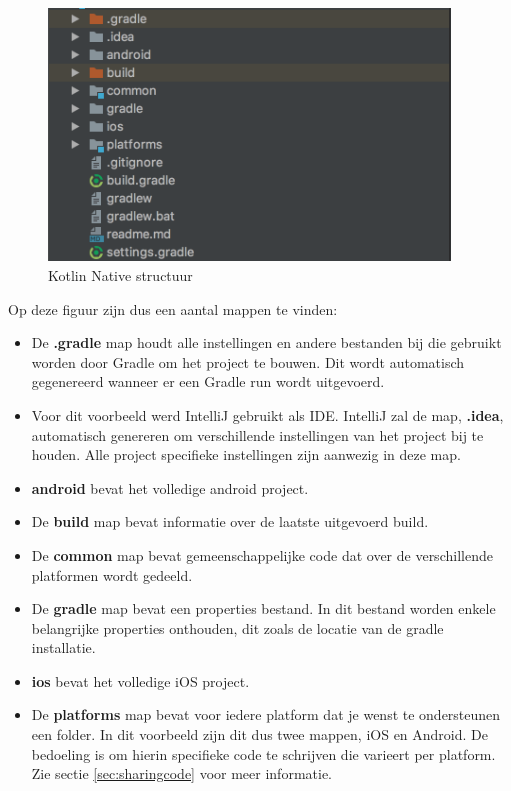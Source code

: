 \begin{figure} [ht]
	\centering
	\includegraphics[width=0.95\textwidth]{img/kn-project-structure}
	\caption{Kotlin Native structuur}
	\label{fig:knstructuur}
\end{figure}

Op deze figuur zijn dus een aantal mappen te vinden:
\begin{itemize}
	\item De \textbf{.gradle} map houdt alle instellingen en andere bestanden bij die gebruikt worden door Gradle om het project te bouwen. Dit wordt automatisch gegenereerd wanneer er een Gradle run wordt uitgevoerd.
	\item Voor dit voorbeeld werd IntelliJ gebruikt als IDE. IntelliJ zal de map, \textbf{.idea}, automatisch genereren om verschillende instellingen van het project bij te houden. Alle project specifieke instellingen zijn aanwezig in deze map.
	\item \textbf{android} bevat het volledige android project.
	\item De \textbf{build} map bevat informatie over de laatste uitgevoerd build.
	\item De \textbf{common} map bevat gemeenschappelijke code dat over de verschillende platformen wordt gedeeld.
	\item De \textbf{gradle} map bevat een properties bestand. In dit bestand worden enkele belangrijke properties onthouden, dit zoals de locatie van de gradle installatie.
	\item \textbf{ios} bevat het volledige iOS project.
	\item De \textbf{platforms} map bevat voor iedere platform dat je wenst te ondersteunen een folder. In dit voorbeeld zijn dit dus twee mappen, iOS en Android. De bedoeling is om hierin specifieke code te schrijven die varieert per platform. Zie sectie \ref{sec:sharingcode} voor meer informatie.
\end{itemize}

